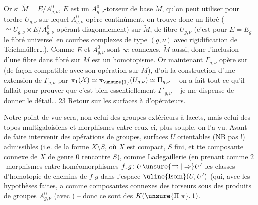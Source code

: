 Or si $\widetilde M=E/A_{g,\nu}^0$, $E$ est un $A_{g,\nu}^0$-torseur de base $\widetilde M$, qu'on peut utiliser pour tordre  $U_{g,\nu}$ sur lequel $A_{g,\nu}^0$ opère continûment, on trouve donc un fibré  ($\simeq U_{g,\nu}\times E/A_{g,\nu}^0$ opérant diagonalement) sur $\widetilde M$, de fibre $U_{g,\nu}$ (c'est pour $E=E_g$ le fibré universel en courbes complexes de type $(g,\nu)$ avec rigidification de Teichmüller\ldots). Comme $E$ et $A_{g,\nu}^0$
sont $\infty$-connexes, $\widetilde M$ aussi, donc l'inclusion d'une fibre dans  fibré  sur $\widetilde M$ est un homotopisme. Or maintenant $\Gamma_{g,\nu}$ opère sur  (de façon compatible avec son opération sur $\widetilde M$), d'où la construction d'une extension de $\Gamma_{g,\nu}$ par $\pi_1(\mathcal X)\simeq\pi_{\unsure{1}}(U_{g,\nu})\simeq\Pi_{g,\nu}$ -- on a fait tout ce qu'il fallait pour prouver que c'est bien essentiellement $\Gamma'_{g,\nu}$ -- je me dispense de donner le détail\ldots
{}
\uline{23} Retour sur les surfaces à  d'opérateurs.

Notre point de vue sera, non celui des groupes extérieurs à lacets, mais celui des topos multigaloisiens et morphismes entre ceux-ci, plus souple, on l'a vu.
Avant de faire intervenir des opérations de groupes,   surfaces $U$ orientables (NB pas  !)   \uline{admissibles} (i.e. de la forme $X\setminus S$, où $X$ est compact, $S$ fini, et tte composante connexe de $X$ de genre $0$ rencontre $S$), comme  Ladegaillerie (en prenant comme $2$-morphismes entre  homéomorphismes $f,g\colon U\unsure{\rightrightarrows|\Rightarrow}U'$ les classes d'homotopie de chemins de $f$  $g$ dans l'espace $\uline{\mathrm{Isom}}(U,U')$ (qui, avec les hypothèses faites, a comme composantes connexes des  torseurs sous des produits de groupes $A_{g,\nu}^0$ (avec ) -- donc ce sont des $K(\unsure{\Pi|\pi},1)$.

